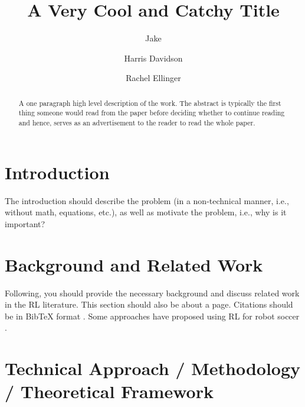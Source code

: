 %
%

\usepackage[utf8]{inputenc}
\usepackage[numbers]{natbib}
\usepackage{graphicx}
\usepackage{amsmath,amssymb}
\usepackage{hyperref}

\title{A Very Cool and Catchy Title}
\author{Jake \and Harris Davidson \and Rachel Ellinger}
\date{\vspace{-1em}}



\maketitle

\ifproposal\else
\begin{abstract}
A one paragraph high level description of the work. The abstract is typically
the first thing someone would read from the paper before deciding whether to
continue reading and hence, serves as an advertisement to the reader to read
the whole paper.
\end{abstract}
\fi

\section{Introduction}

The introduction should describe the problem (in a non-technical manner, i.e.,
without math, equations, etc.), as well as motivate the problem, i.e., why is
it important?

\section{Background and Related Work}

Following, you should provide the necessary background and discuss related
work in the RL literature. This section should also be about a page.
Citations should be in BibTeX format \citep{thrun2005probabilistic}.
\ifproposal
Some approaches have proposed using RL for robot soccer
\cite{riedmiller2009reinforcement}.
\fi

\section{Technical Approach / Methodology / Theoretical Framework}

